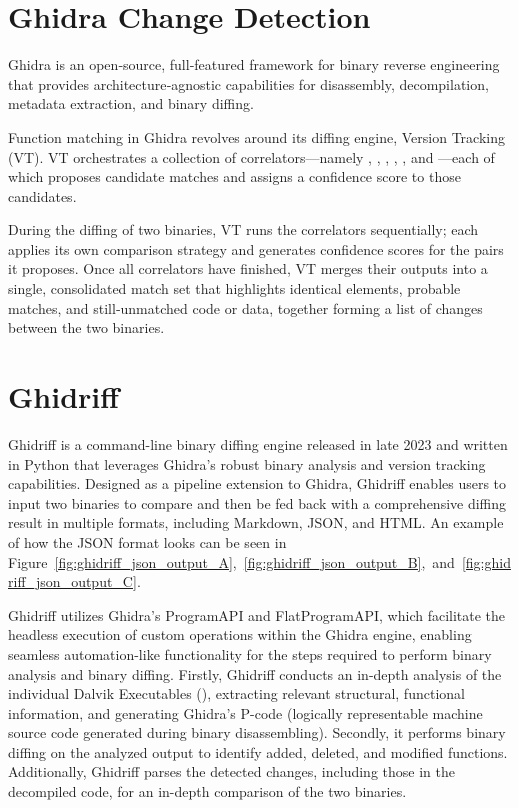 \section{Ghidra Change Detection}
\label{sec:background:ghidra_function_matching}

Ghidra \cite{ghidra_official} is an open‑source, full‑featured framework for binary reverse engineering that provides architecture‑agnostic capabilities for disassembly, decompilation, metadata extraction, and binary diffing.

Function matching in Ghidra revolves around its diffing engine, Version Tracking (VT). VT orchestrates a collection of correlators—namely , , , , , and  \cite{ghidra_github}—each of which proposes candidate matches and assigns a confidence score to those candidates.

During the diffing of two binaries, VT runs the correlators sequentially; each applies its own comparison strategy and generates confidence scores for the pairs it proposes. Once all correlators have finished, VT merges their outputs into a single, consolidated match set that highlights identical elements, probable matches, and still‑unmatched code or data, together forming a list of changes between the two binaries.



\section{Ghidriff}
\label{sec:background:ghidriff}
Ghidriff \cite{ghidriff_official_blog, Ghidriff} is a command-line binary diffing engine released in late 2023 and written in Python that leverages Ghidra's robust binary analysis and version tracking capabilities. Designed as a pipeline extension to Ghidra, Ghidriff enables users to input two binaries to compare and then be fed back with a comprehensive diffing result in multiple formats, including Markdown, JSON, and HTML. An example of how the JSON format looks can be seen in Figure~\ref{fig:ghidriff_json_output_A},~\ref{fig:ghidriff_json_output_B},~and~\ref{fig:ghidriff_json_output_C}.

Ghidriff utilizes Ghidra's ProgramAPI and FlatProgramAPI, which facilitate the headless execution of custom operations within the Ghidra engine, enabling seamless automation-like functionality for the steps required to perform binary analysis and binary diffing. Firstly, Ghidriff conducts an in-depth analysis of the individual Dalvik Executables (), extracting relevant structural, functional information, and generating Ghidra's P-code (logically representable machine source code generated during binary disassembling). Secondly, it performs binary diffing on the analyzed output to identify added, deleted, and modified functions. Additionally, Ghidriff parses the detected changes, including those in the decompiled code, for an in-depth comparison of the two binaries.
